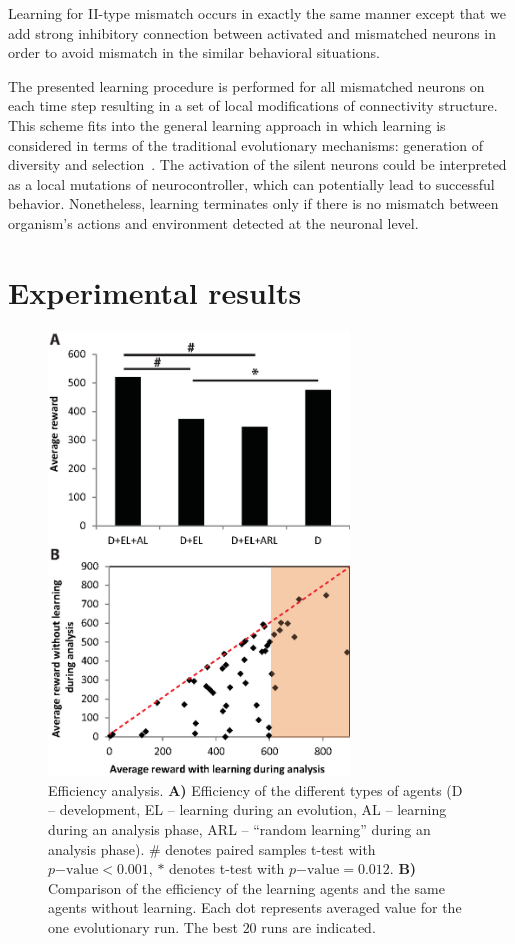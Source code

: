 \documentclass[letterpaper]{article}
\begin{document}
Learning for II-type mismatch occurs in exactly the same manner except that we add strong inhibitory connection between activated and mismatched neurons in order to avoid mismatch in the similar behavioral situations.   

The presented learning procedure is performed for all mismatched neurons on each time step resulting in a set of local modifications of connectivity structure. This scheme fits into the general learning approach in which learning is considered in terms of the traditional evolutionary mechanisms: generation of diversity and selection~\citep{Burtsev2008}. The activation of the silent neurons could be interpreted as a local mutations of neurocontroller, which can potentially lead to successful behavior. Nonetheless, learning terminates only if there is no mismatch between organism's actions and environment detected at the neuronal level.      

\section{Experimental results}

\begin{figure}[!t]
\begin{center}
\includegraphics[width=8cm]{Fig2_Efficiency_analysis.eps}
\caption{Efficiency analysis. \textbf{A)} Efficiency of the different types of agents (D -- development, EL -- learning during an evolution, AL -- learning during an analysis phase, ARL -- ``random learning'' during an analysis phase). $\#$ denotes paired samples t-test with $p\mathrm{-value}<0.001$, $*$ denotes t-test with $p\mathrm{-value}=0.012$. \textbf{B)} Comparison of the efficiency of the learning agents and the same agents without learning. Each dot represents averaged value for the one evolutionary run. The best $20$ runs are indicated.}
\label{Efficiency_analysis}
\end{center}
\end{figure}
\end{document}

